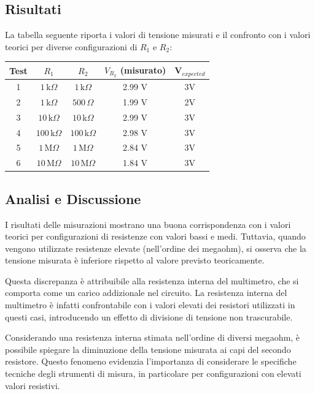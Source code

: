 \subsection{Risultati}

La tabella seguente riporta i valori di tensione misurati e il confronto con i valori teorici per diverse configurazioni di \( R_1 \) e \( R_2 \):

\begin{center}
\begin{tabular}{ c | c | c | c | c}

Test & $R_1$ & $R_2$ & $V_{R_2}$ (misurato) & V$_{expected}$ \\ 
\hline
1 & \(1 \, \text{k}\Omega\) & \(1 \, \text{k}\Omega\) & 2.99 V & 3V\\ 
\hline
2 & \(1 \, \text{k}\Omega\) & \(500 \, \Omega\) & 1.99 V & 2V\\
\hline
3 & \(10 \, \text{k}\Omega\) & \(10 \, \text{k}\Omega\) & 2.99 V & 3V\\
\hline
4 & \(100 \, \text{k}\Omega\) & \(100 \, \text{k}\Omega\) & 2.98 V & 3V\\
\hline
5 & \(1 \, \text{M}\Omega\) & \(1 \, \text{M}\Omega\) & 2.84 V & 3V\\
\hline
6 & \(10 \, \text{M}\Omega\) & \(10 \, \text{M}\Omega\) & 1.84 V & 3V\\

\end{tabular}
\end{center}

\subsection{Analisi e Discussione} 
I risultati delle misurazioni mostrano una buona corrispondenza con i valori teorici per configurazioni di resistenze con valori bassi e medi. Tuttavia, quando vengono utilizzate resistenze elevate (nell’ordine dei megaohm), si osserva che la tensione misurata è inferiore rispetto al valore previsto teoricamente.

Questa discrepanza è attribuibile alla resistenza interna del multimetro, che si comporta come un carico addizionale nel circuito. La resistenza interna del multimetro è infatti confrontabile con i valori elevati dei resistori utilizzati in questi casi, introducendo un effetto di divisione di tensione non trascurabile.

Considerando una resistenza interna stimata nell’ordine di diversi megaohm, è possibile spiegare la diminuzione della tensione misurata ai capi del secondo resistore. Questo fenomeno evidenzia l’importanza di considerare le specifiche tecniche degli strumenti di misura, in particolare per configurazioni con elevati valori resistivi.

